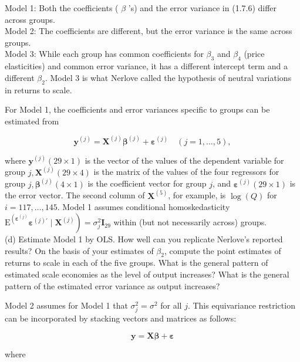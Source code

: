 \documentclass[10pt]{article}
\begin{document}
Model 1: Both the coefficients ( $\beta$ 's) and the error variance in (1.7.6) differ across groups.\\
Model 2: The coefficients are different, but the error variance is the same across groups.\\
Model 3: While each group has common coefficients for $\beta_{3}$ and $\beta_{4}$ (price elasticities) and common error variance, it has a different intercept term and a different $\beta_{2}$. Model 3 is what Nerlove called the hypothesis of neutral variations in returns to scale.

For Model 1, the coefficients and error variances specific to groups can be estimated from

$$
\mathbf{y}^{(j)}=\mathbf{X}^{(j)} \boldsymbol{\beta}^{(j)}+\boldsymbol{\varepsilon}^{(j)} \quad(j=1, \ldots, 5),
$$

where $\mathbf{y}^{(j)}(29 \times 1)$ is the vector of the values of the dependent variable for group $j, \mathbf{X}^{(j)}(29 \times 4)$ is the matrix of the values of the four regressors for group $j, \boldsymbol{\beta}^{(j)} (4 \times 1)$ is the coefficient vector for group $j$, and $\boldsymbol{\varepsilon}^{(j)}(29 \times 1)$ is the error vector. The second column of $\mathbf{X}^{(5)}$, for example, is $\log (Q)$ for $i=117, \ldots, 145$. Model 1 assumes conditional homoskedasticity $\left.\mathrm{E}^{\left(\boldsymbol{\varepsilon}^{(j)}\right.} \boldsymbol{\varepsilon}^{(j) \prime} \mid \mathbf{X}^{(j)}\right)=\sigma_{j}^{2} \mathbf{I}_{29}$ within (but not necessarily across) groups.\\
(d) Estimate Model 1 by OLS. How well can you replicate Nerlove's reported results? On the basis of your estimates of $\beta_{2}$, compute the point estimates of returns to scale in each of the five groups. What is the general pattern of estimated scale economies as the level of output increases? What is the general pattern of the estimated error variance as output increases?

Model 2 assumes for Model 1 that $\sigma_{j}^{2}=\sigma^{2}$ for all $j$. This equivariance restriction can be incorporated by stacking vectors and matrices as follows:

$$
\mathbf{y}=\mathbf{X} \boldsymbol{\beta}+\boldsymbol{\varepsilon}
$$

where
\end{document}
